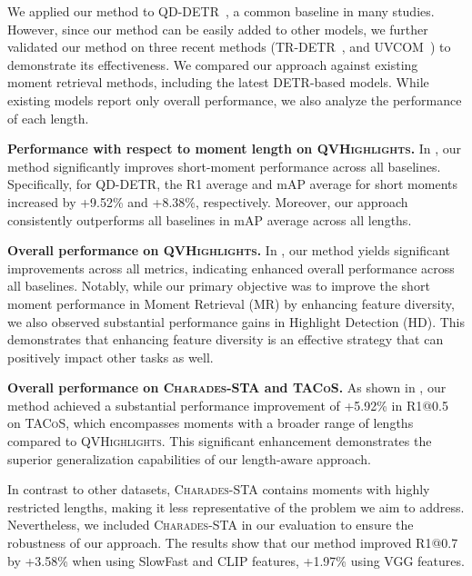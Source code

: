 We applied our method to QD-DETR~\cite{moon2023query_QD-DETR}, a common baseline in many studies.
However, since our method can be easily added to other models, we further validated our method on three recent methods (TR-DETR~\cite{sun2024tr_TR-DETR}, and UVCOM~\cite{xiao2024bridging_UVCOM}) to demonstrate its effectiveness.
We compared our approach against existing moment retrieval methods, including the latest DETR-based models.
While existing models report only overall performance, we also analyze the performance of each length.

\vspace{1mm}
\noindent\textbf{Performance with respect to moment length on \textsc{QVHighlights}.} 
In , our method significantly improves short-moment performance across all baselines. Specifically, for QD-DETR, the R1 average and mAP average for short moments increased by +9.52\% and +8.38\%, respectively. Moreover, our approach consistently outperforms all baselines in mAP average across all lengths.

\vspace{1mm}
\noindent\textbf{Overall performance on \textsc{QVHighlights}.} 
In , our method yields significant improvements across all metrics, indicating enhanced overall performance across all baselines. Notably, while our primary objective was to improve the short moment performance in Moment Retrieval (MR) by enhancing feature diversity, we also observed substantial performance gains in Highlight Detection (HD). This demonstrates that enhancing feature diversity is an effective strategy that can positively impact other tasks as well.

\vspace{1mm}
\noindent\textbf{Overall performance on \textsc{Charades-STA} and \textsc{TACoS}.} 
As shown in , our method achieved a substantial performance improvement of +5.92\% in R1@0.5 on \textsc{TACoS}, which encompasses moments with a broader range of lengths compared to \textsc{QVHighlights}. This significant enhancement demonstrates the superior generalization capabilities of our length-aware approach.

In contrast to other datasets, \textsc{Charades-STA} contains moments with highly restricted lengths, making it less representative of the problem we aim to address. Nevertheless, we included \textsc{Charades-STA} in our evaluation to ensure the robustness of our approach. The results show that our method improved R1@0.7 by +3.58\% when using SlowFast and CLIP features, +1.97\% using VGG features. 

